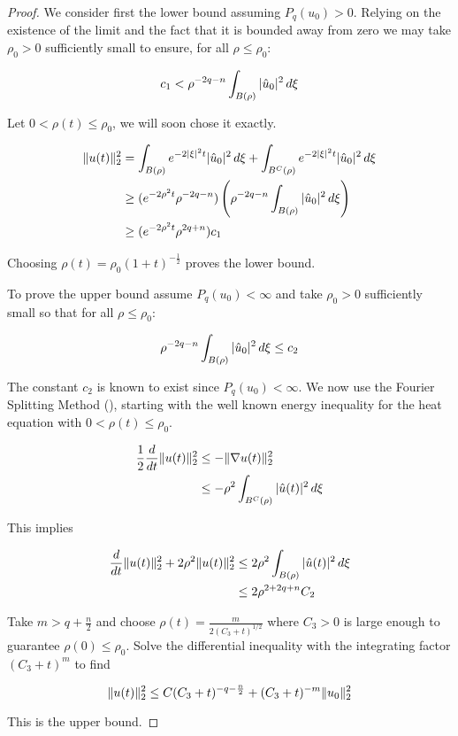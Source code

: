 \documentclass{amsart}
\numberwithin{Theorem}{section}
\numberwithin{equation}{section}
\theoremstyle{definition}
\theoremstyle{remark}
\begin{document}
\begin{proof}

We consider first the lower bound assuming $P_q(u_0)>0$.   Relying on the existence of the limit and the fact that it is bounded away from zero we may take $\rho_0>0$ sufficiently small to ensure, for all $\rho\leq\rho_0$:

\begin{equation}
c_1<\rho^{-2q-n}\int_{B(\rho)}|\hat{u}_0|^2\,d\xi\notag
\end{equation}

Let $0<\rho(t)\leq\rho_0$, we will soon chose it exactly.

\begin{align}
\|u(t)\|_2^2 &= \int_{B(\rho)}e^{-2|\xi|^2t}|\hat{u}_0|^2\,d\xi +\int_{B^C(\rho)}e^{-2|\xi|^2t}|\hat{u}_0|^2\,d\xi\notag\\
&\geq (e^{-2\rho^2t}\rho^{-2q-n})\left(\rho^{-2q-n}\int_{B(\rho)}|\hat{u}_0|^2\,d\xi\right) \notag\\
&\geq (e^{-2\rho^2t}\rho^{2q+n})c_1\notag
\end{align}

Choosing $\rho(t)= \rho_0(1+t)^{-\frac{1}{2}}$ proves the lower bound.

To prove the upper bound assume $P_q(u_0)<\infty$ and take $\rho_0>0$ sufficiently small so that for all $\rho\leq\rho_0$:

\begin{equation}
\rho^{-2q-n}\int_{B(\rho)}|\hat{u}_0|^2\,d\xi\leq c_2\notag
\end{equation}

The constant $c_2$ is known to exist since $P_q(u_0)<\infty$.  We now use the Fourier Splitting Method (\cite{S}), starting with the well known energy inequality for the heat equation with $0<\rho(t)\leq\rho_0$.

\begin{align}
\frac{1}{2}\frac{d}{dt}\|u(t)\|_2^2&\leq -\|\nabla u(t)\|_2^2\notag\\
&\leq -\rho^2\int_{B^C(\rho)}|\hat{u}(t)|^2\,d\xi\notag
\end{align}

This implies

\begin{align}
\frac{d}{dt}\|u(t)\|_2^2 +2\rho^2\|u(t)\|_2^2 &\leq 2\rho^2\int_{B(\rho)}|\hat{u}(t)|^2\,d\xi\notag\\
&\leq 2\rho^{2+2q+n}C_2\notag
\end{align}

Take $m>q+\frac{n}{2}$ and choose $\rho(t)=\frac{m}{2(C_3+t)^{1/2}}$ where $C_3>0$ is large enough to guarantee $\rho(0)\leq \rho_0$.  Solve the differential inequality with the integrating factor $(C_3+t)^m$ to find

\begin{equation}
\|u(t)\|_2^2\leq C(C_3+t)^{-q-\frac{n}{2}}+(C_3+t)^{-m}\|u_0\|_2^2\notag
\end{equation}

This is the upper bound.

\end{proof}
\end{document}
